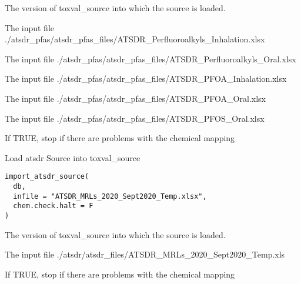 \documentclass[letterpaper]{book}
\begin{document}
%
\begin{Arguments}
\begin{ldescription}
\item[\code{db}] The version of toxval\_source into which the source is loaded.

\item[\code{infile1}] The input file ./atsdr\_pfas/atsdr\_pfas\_files/ATSDR\_Perfluoroalkyls\_Inhalation.xlsx

\item[\code{infile2}] The input file ./atsdr\_pfas/atsdr\_pfas\_files/ATSDR\_Perfluoroalkyls\_Oral.xlsx

\item[\code{infile3}] The input file ./atsdr\_pfas/atsdr\_pfas\_files/ATSDR\_PFOA\_Inhalation.xlsx

\item[\code{infile4}] The input file ./atsdr\_pfas/atsdr\_pfas\_files/ATSDR\_PFOA\_Oral.xlsx

\item[\code{infile5}] The input file ./atsdr\_pfas/atsdr\_pfas\_files/ATSDR\_PFOS\_Oral.xlsx

\item[\code{chem.check.halt}] If TRUE, stop if there are problems with the chemical mapping
\end{ldescription}
\end{Arguments}
%
\begin{Description}\relax
Load atsdr Source into toxval\_source
\end{Description}
%
\begin{Usage}
\begin{verbatim}
import_atsdr_source(
  db,
  infile = "ATSDR_MRLs_2020_Sept2020_Temp.xlsx",
  chem.check.halt = F
)
\end{verbatim}
\end{Usage}
%
\begin{Arguments}
\begin{ldescription}
\item[\code{db}] The version of toxval\_source into which the source is loaded.

\item[\code{infile}] The input file ./atsdr/atsdr\_files/ATSDR\_MRLs\_2020\_Sept2020\_Temp.xls

\item[\code{chem.check.halt}] If TRUE, stop if there are problems with the chemical mapping
\end{ldescription}
\end{Arguments}
\end{document}
